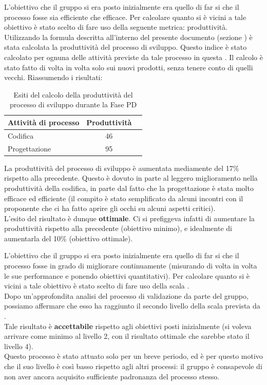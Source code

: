 				L'obiettivo che il gruppo si era posto inizialmente era quello di far si che il processo fosse sia efficiente che efficace. Per calcolare quanto si è vicini a tale obiettivo è stato scelto di fare uso della seguente metrica: produttività.\\
				Utilizzando la formula descritta all'interno del presente documento (sezione ) è stata calcolata la produttività del processo di sviluppo. Questo indice è stato calcolato per ognuna delle attività previste da tale processo in questa . Il calcolo è stato fatto di volta in volta solo sui nuovi prodotti, senza tenere conto di quelli vecchi. Riassumendo i risultati:
				\begin{table}[H]
			    	\centering
					\begin{tabu}{| l | c | c |}
						\hline
						Attività di processo   & Produttività   \\ \hline \hline
						Codifica               & 46             \\ \hline
						Progettazione          & 95             \\ \hline
					\end{tabu}
				\caption{Esiti del calcolo della produttività del processo di sviluppo durante la Fase PD}
				\end{table}
				La produttività del processo di sviluppo è aumentata mediamente del 17\% rispetto alla  precedente. Questo è dovuto in parte al leggero miglioramento nella produttività della codifica, in parte dal fatto che la progettazione è stata molto efficace ed efficiente (il compito è stato semplificato da alcuni incontri con il proponente che ci ha fatto aprire gli occhi su alcuni aspetti critici).\\
				L'esito del risultato è dunque \textbf{ottimale}. Ci si prefiggeva infatti di aumentare la produttività rispetto alla  precedente (obiettivo minimo), e idealmente di aumentarla del 10\% (obiettivo ottimale).
			
				L'obiettivo che il gruppo si era posto inizialmente era quello di far si che il processo fosse in grado di migliorare continuamente (misurando di volta in volta le sue performance e ponendo obiettivi quantitativi). Per calcolare quanto si è vicini a tale obiettivo è stato scelto di fare uso della scala .\\
				Dopo un'approfondita analisi del processo di validazione da parte del gruppo, possiamo affermare che esso ha raggiunto il secondo livello della scala prevista da .\\
				Tale risultato è \textbf{accettabile} rispetto agli obiettivi posti inizialmente (si voleva arrivare come minimo al livello 2, con il risultato ottimale che sarebbe stato il livello 4).\\
				Questo processo è stato attuato solo per un breve periodo, ed è per questo motivo che il suo livello  è così basso rispetto agli altri processi: il gruppo è consapevole di non aver ancora acquisito sufficiente padronanza del processo stesso.
			
